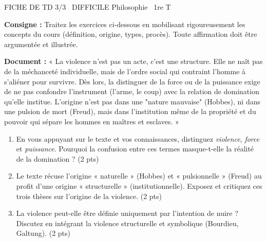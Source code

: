 \documentclass[11pt]{article}
\begin{document}
\begin{tcolorbox}[enhanced,colback=popink,colframe=popink,arc=10pt,boxrule=0pt,left=12pt,right=12pt,top=9pt,bottom=9pt]
{\color{white}\popxbold\small FICHE DE TD 3/3 \textbullet\ DIFFICILE \hfill Philosophie \textbullet\ 1re T\par}
\end{tcolorbox}
\vspace{4pt}
\noindent\textbf{Consigne :} Traitez les exercices ci-dessous en mobilisant rigoureusement les concepts du cours (définition, origine, types, procès). Toute affirmation doit être argumentée et illustrée.

\begin{exercice}
\textbf{Document :} « La violence n'est pas un acte, c'est une structure. Elle ne naît pas de la méchanceté individuelle, mais de l'ordre social qui contraint l'homme à s'aliéner pour survivre. Dès lors, la distinguer de la force ou de la puissance exige de ne pas confondre l'instrument (l'arme, le coup) avec la relation de domination qu'elle institue. L'origine n'est pas dans une "nature mauvaise" (Hobbes), ni dans une pulsion de mort (Freud), mais dans l'institution même de la propriété et du pouvoir qui sépare les hommes en maîtres et esclaves. »

\begin{enumerate}
    \item En vous appuyant sur le texte et vos connaissances, distinguez \textit{violence}, \textit{force} et \textit{puissance}. Pourquoi la confusion entre ces termes masque-t-elle la réalité de la domination ? \hfill (2 pts)
    \item Le texte récuse l'origine « naturelle » (Hobbes) et « pulsionnelle » (Freud) au profit d'une origine « structurelle » (institutionnelle). Exposez et critiquez ces trois thèses sur l'origine de la violence. \hfill (2 pts)
    \item La violence peut-elle être définie uniquement par l'intention de nuire ? Discutez en intégrant la violence structurelle et symbolique (Bourdieu, Galtung). \hfill (2 pts)
\end{enumerate}
\end{exercice}
\end{document}
